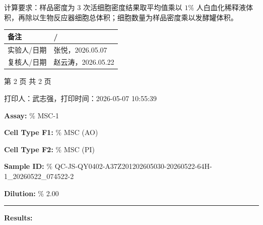 \documentclass[UTF8,10pt,a4paper,fontset=fandol]{ctexart}
\newcommand{\fieldvalue}[1]{#1}
\newcommand{\handwritten}[1]{#1}
\begin{document}
\medskip

\noindent
计算要求：样品密度为 3 次活细胞密度结果取平均值乘以 $1\%$ 人白血化稀释液体积，再除以生物反应器细胞总体积；细胞数量为样品密度乘以发酵罐体积。

\begin{center}
\begin{tabular}{|p{2cm}|p{11cm}|}
\hline
备注 &
\fieldvalue{\handwritten{/}} \\
\hline
实验人/日期 &
\fieldvalue{\handwritten{张悦，2026.05.07}} \\
\hline
复核人/日期 &
\fieldvalue{\handwritten{赵云涛，2026.05.22}} \\
\hline
\end{tabular}
\end{center}

\begin{center}
第 2 页 共 2 页

\medskip
打印人：武志强，打印时间：2026-05-07 10:55:39
\end{center}

\newpage

\noindent\textbf{Assay: }\%
\fieldvalue{MSC-1}

\medskip
\noindent\textbf{Cell Type F1: }\%
\fieldvalue{MSC (AO)}

\noindent\textbf{Cell Type F2: }\%
\fieldvalue{MSC (PI)}

\medskip
\noindent\textbf{Sample ID: }\%
\fieldvalue{QC-JS-QY0402-A37Z201202605030-20260522-64H-1\_20260522\_074522-2}

\noindent\textbf{Dilution: }\%
\fieldvalue{2.00}

\medskip
\hrule
\medskip

\noindent\textbf{Results:}
\end{document}
